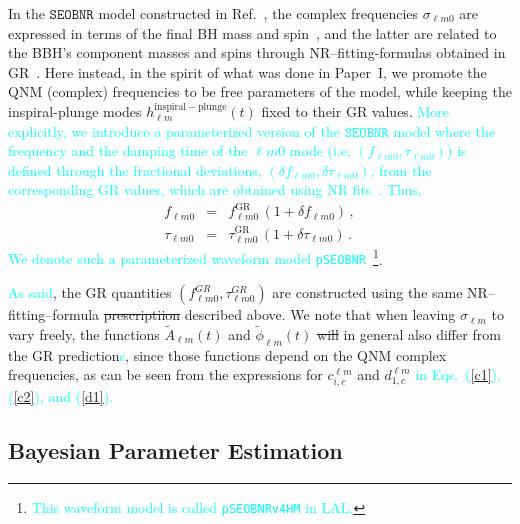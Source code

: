 \documentclass[twocolumn,prd,aps,superscriptaddress,preprintnumbers,tightenlines,showpacs,nofootinbib,eqsecnum,amsfonts,amsmath]{revtex4-1}
\newcommand{\paperone}{Paper~I\xspace}
\newcommand{\ab}[1]{\textcolor{cyan}{#1}}
\newcommand{\pSEOB}{\texttt{pSEOBNR}}
\newcommand{\SEOB}{\texttt{SEOBNR}}
\begin{document}
In the $\SEOB$ model constructed in Ref.~\cite{Cotesta:2018fcv}, the
complex frequencies $\sigma_{\ell m 0}$ are expressed in terms of the
final BH mass and spin~\cite{Berti:2005ys,Berti:2009kk}, and the
latter are related to the BBH's component masses and spins through
NR--fitting-formulas obtained in
GR~\cite{Taracchini:2013rva,Hofmann:2016yih}. Here instead, in the
spirit of what was done in \paperone, we promote the QNM (complex)
frequencies to be free parameters of the model, while keeping the
inspiral-plunge modes $h_{\ell m}^\mathrm{inspiral-plunge}(t)$ fixed
to their GR values. \ab{More explicitly, we introduce a parameterized 
version of the $\SEOB$ model where the frequency and the
damping time of the ${\ell m 0}$ mode (i.e, $(f_{\ell m 0}, \tau
_{\ell m 0})$) is defined through the fractional deviations, $(\delta
f_{\ell m 0},\delta \tau_{\ell m 0})$, from the corresponding GR
values, which are obtained using NR fits~\cite{Taracchini:2013rva,Hofmann:2016yih}. Thus,} 
\begin{eqnarray}
f_{\ell m 0} &=& f_{\ell m 0}^{\text{GR}}\, (1 + \delta f_{\ell m 0})\,,\label{eq:nongr_freqs_a} \\ 
\tau _{\ell m 0} &=& \tau _{\ell m 0}^{\text{GR}}\, (1 + \delta \tau_{\ell m 0})\,. \label{eq:nongr_freqs_b}
\end{eqnarray}
\ab{We denote such a parameterized waveform model \pSEOB}~\footnote{\ab{This 
waveform model is called {\tt pSEOBNRv4HM} in LAL.}}.

\ab{As said}, the GR quantities $( f_{\ell m 0}^{GR},\tau_{\ell m 0}^{GR})$ are
constructed using the same NR--fitting--formula \sout{prescriptiion} 
described above. We note that when leaving $\sigma_{\ell m}$ to vary
freely, the functions $\tilde{A}_{\ell m}(t)$ and $\tilde{\phi}_{\ell
  m}(t)$ \sout{will} in general also differ from the GR prediction\ab{s}, since
those functions depend on the QNM complex frequencies, as can be seen
from the expressions for $c_{i,c}^{\ell m}$ and $d_{1,c}^{\ell m}$ \ab{in Eqs.~(\ref{c1}), 
(\ref{c2}), and (\ref{d1}).}


\subsection{Bayesian Parameter Estimation}\label{sec:method}
\end{document}

